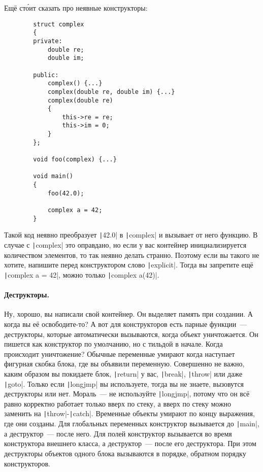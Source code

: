 \documentclass{article}
\begin{document}
    Ещё ст\'{о}ит сказать про неявные конструкторы:
    \begin{verbatim}
        struct complex
        {
        private:
            double re;
            double im;
            
        public:
            complex() {...}
            complex(double re, double im) {...}
            complex(double re)
            {
                this->re = re;
                this->im = 0;
            }
        };

        void foo(complex) {...}

        void main()
        {
            foo(42.0);

            complex a = 42;
        }
    \end{verbatim}
    Такой код неявно преобразует \texttt|42.0| в \texttt|complex| и вызывает от него функцию. В случае с \texttt|complex| это оправдано, но если у вас контейнер инициализируется количеством элементов, то так неявно делать странно. Поэтому если вы такого не хотите, напишите перед конструктором слово \texttt|explicit|. Тогда вы запретите ещё \texttt|complex a = 42|, можно только \texttt|complex a(42)|.
    \paragraph{Деструкторы.}
    Ну, хорошо, вы написали свой контейнер. Он выделяет память при создании. А когда вы её освободите-то? А вот для конструкторов есть парные функции~--- деструкторы, которые автоматически вызываются, когда объект уничтожается. Он пишется как конструктор по умолчанию, но с тильдой в начале. Когда происходит уничтожение? Обычные переменные умирают когда наступает фигурная скобка блока, где вы объявили переменную. Совершенно не важно, каким образом вы покидаете блок, \texttt|return| у вас, \texttt|break|, \texttt|throw| или даже \texttt|goto|. Только если \texttt|longjmp| вы используете, тогда вы не знаете, вызовутся деструкторы или нет. Мораль~--- не используйте \texttt|longjmp|, потому что он всё равно корректно работает только вверх по стеку, а вверх по стеку можно заменить на \texttt|throw|-\texttt|catch|. Временные объекты умирают по концу выражения, где они созданы. Для глобальных переменных конструктор вызывается до \texttt|main|, а деструктор~--- после него. Для полей конструктор вызывается во время конструктора внешнего класса, а деструктор~--- после его деструктора. При этом деструкторы объектов одного блока вызываются в порядке, обратном порядку конструкторов.
\end{document}
